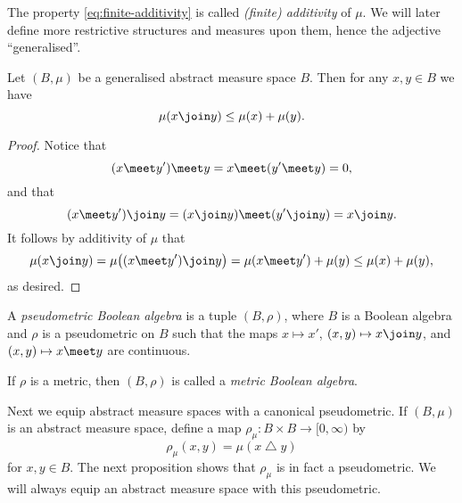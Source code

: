 \documentclass[article, a4paper, 11pt, oneside]{memoir}
\numberwithin{equation}{chapter}
\renewcommand{\symdiff}{\mathbin{\triangle}}
\begin{document}
The property \cref{eq:finite-additivity} is called \emph{(finite) additivity} of $\mu$. We will later define more restrictive structures and measures upon them, hence the adjective \enquote{generalised}.

\begin{proposition}
    Let $(B,\mu)$ be a generalised abstract measure space $B$. Then for any $x,y \in B$ we have
    \begin{equation*}
        \mu(x \join y)
            \leq \mu(x) + \mu(y).
    \end{equation*}
\end{proposition}

\begin{proof}
    Notice that
    \begin{equation*}
        (x \meet y') \meet y = x \meet (y' \meet y) = 0,
    \end{equation*}
    and that
    \begin{equation*}
        (x \meet y') \join y = (x \join y) \meet (y' \join y) = x \join y.
    \end{equation*}
    It follows by additivity of $\mu$ that
    \begin{equation*}
        \mu(x \join y)
            = \mu \bigl( (x \meet y') \join y \bigr)
            = \mu(x \meet y') + \mu(y)
            \leq \mu(x) + \mu(y),
    \end{equation*}
    as desired.
\end{proof}


\begin{definition}
    A \emph{pseudometric Boolean algebra} is a tuple $(B,\rho)$, where $B$ is a Boolean algebra and $\rho$ is a pseudometric on $B$ such that the maps $x \mapsto x'$, $(x,y) \mapsto x \join y$, and $(x,y) \mapsto x \meet y$ are continuous.

    If $\rho$ is a metric, then $(B,\rho)$ is called a \emph{metric Boolean algebra}.
\end{definition}

Next we equip abstract measure spaces with a canonical pseudometric. If $(B,\mu)$ is an abstract measure space, define a map $\rho_\mu \colon B \times B \to [0,\infty)$ by
%
\begin{equation}
    \label{eq:Boolean-metric}
    \rho_\mu(x,y)
        = \mu(x \symdiff y)
\end{equation}
%
for $x,y \in B$. The next proposition shows that $\rho_\mu$ is in fact a pseudometric. We will always equip an abstract measure space with this pseudometric.
\end{document}
